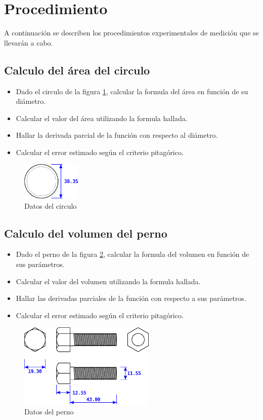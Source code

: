 \documentclass[letter,11pt]{article}
\begin{document}
\section{Procedimiento}
A continuación se describen los procedimientos experimentales de medición que se
llevarán a cabo.

\subsection{Calculo del área del circulo}
\begin{itemize}
\item Dado el circulo de la figura \ref{circulo}, calcular la formula del
área en función de su diámetro.
\item Calcular el valor del área utilizando la formula hallada.
\item Hallar la derivada parcial de la función con respecto al diámetro.
\item Calcular el error estimado según el criterio pitagórico.
\end{itemize}

\begin{figure}
\centering
\includegraphics[width=0.25\textwidth]{eps/02_01.circulo.eps}
\caption{Datos del circulo}
\label{circulo}
\end{figure}

\subsection{Calculo del volumen del perno}
\begin{itemize}
\item Dado el perno de la figura \ref{perno}, calcular la formula del
volumen en función de sus parámetros.
\item Calcular el valor del volumen utilizando la formula hallada.
\item Hallar las derivadas parciales de la función con respecto a sus
parámetros.
\item Calcular el error estimado según el criterio pitagórico.
\end{itemize}

\begin{figure}
\centering
\includegraphics[width=0.58\textwidth]{eps/02_02.perno.eps}
\caption{Datos del perno}
\label{perno}
\end{figure}
\end{document}
